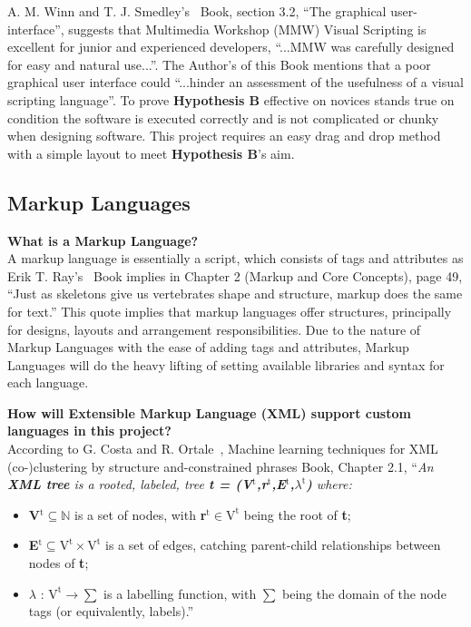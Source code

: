 \documentclass[conference]{IEEEtran}
\begin{document}
      A. M. Winn and T. J. Smedley’s~\cite{winn_multimedia_1998} Book, section 3.2, ``The graphical user-interface'',  suggests that Multimedia Workshop (MMW) Visual Scripting is excellent for junior and experienced developers, ``...MMW was carefully designed for easy and natural use...''. The Author’s of this Book mentions that a poor graphical user interface could ``...hinder an assessment of the usefulness of a visual scripting language''. To prove \textbf{Hypothesis B} effective on novices stands true on condition the software is executed correctly and is not complicated or chunky when designing software. This project requires an easy drag and drop method with a simple layout to meet \textbf{Hypothesis B}’s aim.

    \subsection{Markup Languages}
    \label{subsec:lr-markupLanguages}
      \textbf{What is a Markup Language?}\\
      A markup language is essentially a script, which consists of tags and attributes as Erik T. Ray's~\cite{ray_learning_nodate} Book implies in Chapter 2 (Markup and Core Concepts), page 49, ``Just as skeletons give us vertebrates shape and structure, markup does the same for text.'' This quote implies that markup languages offer structures, principally for designs, layouts and arrangement responsibilities. Due to the nature of Markup Languages with the ease of adding tags and attributes, Markup Languages will do the heavy lifting of setting available libraries and syntax for each language.

      \textbf{How will Extensible Markup Language (XML) support custom languages in this project?}\\
        According to G. Costa and R. Ortale~\cite{costa_machine_2018}, Machine learning techniques for XML (co-)clustering by structure and-constrained phrases Book, Chapter 2.1, ``\textit{An \textbf{XML tree} is a rooted, labeled, tree \textbf{t = (V$^{\text{t}}$,r$^{\text{t}}$,E$^{\text{t}}$,$\lambda^{\text{t}}$)} where:}
        \begin{itemize}
          \item \textbf{V$^{\text{t}} \subseteq \mathbb{N}$} is a set of nodes, with \textbf{r$^{\text{t}} \in \text{V}^{\text{t}}$} being the root of \textbf{t};
          \item \textbf{E$^{\text{t}} \subseteq \text{V}^{\text{t}} \times \text{V}^{\text{t}}$} is a set of edges, catching parent-child relationships between nodes of \textbf{t};
          \item \textbf{$\lambda \text{ : V}^{\text{t}} \rightarrow \sum $} is a labelling function, with $\sum$ being the domain of the node tags (or equivalently, labels).''
        \end{itemize}
\end{document}
